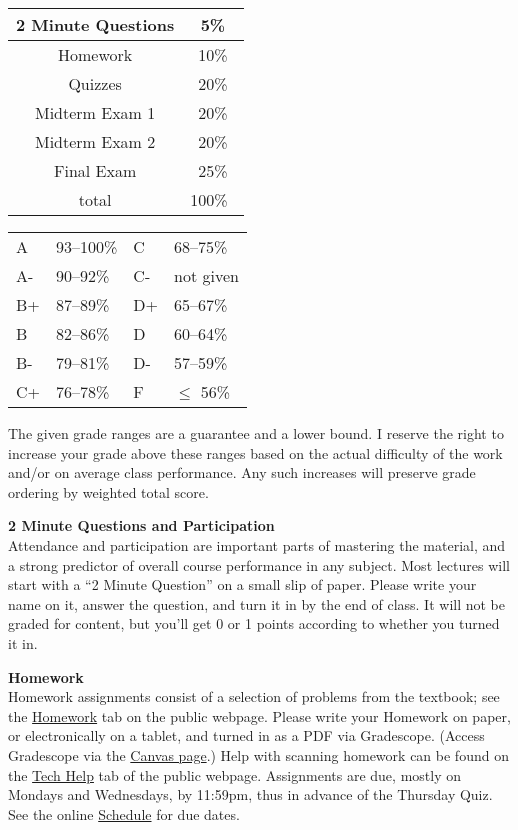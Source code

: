 \documentclass[12pt]{article}
\renewcommand{\emph}[1]{\textsf{\textbf{#1}}}
\newcommand{\localhead}[1]{\par\smallskip\textbf{#1} \smallskip\nobreak\\}%
\def\heading#1{\localhead{\large\emph{#1}}}
\begin{document}
\begin{multicols}{2}
\begin{tabular}{|c|c|}
\hline
2 Minute Questions & 5\%\\
\hline
Homework & 10\% \\
\hline
Quizzes & 20\% \\
\hline
Midterm Exam 1 & 20\% \\
\hline
Midterm Exam 2 & 20\%  \\
\hline
Final Exam & 25\% \\
\hline
total & 100\% \, \\
\hline
\end{tabular}

\begin{tabular}{llll}
A  & 93--100\%& C  & 68--75\%  \\
A- & 90--92\% & C- & not given \\
B+ & 87--89\% & D+ & 65--67\%  \\
B  & 82--86\% & D  & 60--64\%  \\
B- & 79--81\% & D- & 57--59\%  \\
C+ & 76--78\% & F  & $\le$ 56\%
\end{tabular}
\end{multicols}

The given grade ranges are a guarantee and a lower bound.  I reserve the right to increase your grade above these ranges based on the actual difficulty of the work and/or on average class performance.  Any such increases will preserve grade ordering by weighted total score. 


\heading{2 Minute Questions and Participation}
Attendance and participation are important parts of mastering the material, and a strong predictor of overall course performance in any subject.  Most lectures will start with a ``2 Minute Question'' on a small slip of paper.  Please write your name on it, answer the question, and turn it in by the end of class.  It will not be graded for content, but you'll get 0 or 1 points according to whether you turned it in.


\heading{Homework}
Homework assignments consist of a selection of problems from the textbook; see the \href{https://bueler.github.io/calc3/homework.html}{Homework} tab on the public webpage.  Please write your Homework on paper, or electronically on a tablet, and turned in as a PDF via Gradescope.  (Access Gradescope via the \href{https://canvas.alaska.edu/courses/13188}{Canvas page}.)  Help with scanning homework can be found on the \href{https://bueler.github.io/calc3/techHelp.html}{Tech Help} tab of the public webpage.  Assignments are due, mostly on Mondays and Wednesdays, by 11:59pm, thus in advance of the Thursday Quiz.  See the online \href{https://bueler.github.io/calc3/schedule.pdf}{Schedule} for due dates.
\end{document}
